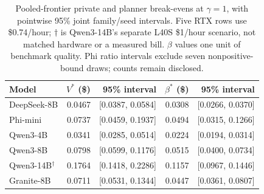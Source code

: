 \begin{table}[t]
\caption{Pooled-frontier private and planner break-evens at $\gamma=1$, with pointwise 95\% joint family/seed intervals. Five RTX rows use \$0.74/hour; $\dagger$ is Qwen3-14B's separate L40S \$1/hour scenario, not matched hardware or a measured bill. $\beta$ values one unit of benchmark quality. Phi ratio intervals exclude seven nonpositive-bound draws; counts remain disclosed.}
\label{tab:money}\centering\small
\begin{tabular}{lrrrr}\toprule
Model & $V^*$ (\$) & 95\% interval & $\beta^*$ (\$) & 95\% interval \\\midrule
DeepSeek-8B & 0.0467 & [0.0387, 0.0584] & 0.0308 & [0.0266, 0.0370] \\
Phi-mini & 0.0737 & [0.0459, 0.1937] & 0.0494 & [0.0315, 0.1266] \\
Qwen3-4B & 0.0341 & [0.0285, 0.0514] & 0.0224 & [0.0194, 0.0314] \\
Qwen3-8B & 0.0798 & [0.0599, 0.1176] & 0.0515 & [0.0400, 0.0734] \\
Qwen3-14B$^\dagger$ & 0.1764 & [0.1418, 0.2286] & 0.1157 & [0.0967, 0.1446] \\
Granite-8B & 0.0711 & [0.0531, 0.1344] & 0.0447 & [0.0361, 0.0807] \\
\bottomrule\end{tabular}\end{table}
